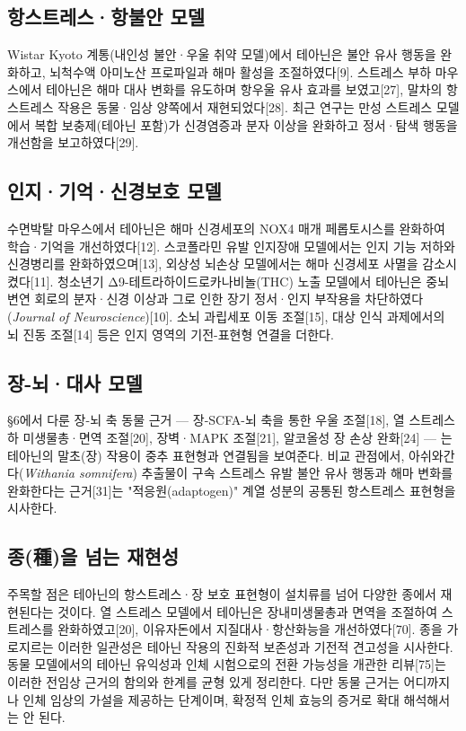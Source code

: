 \documentclass[11pt,oneside]{book}
\begin{document}
\subsection{항스트레스·항불안 모델}
Wistar Kyoto 계통(내인성 불안·우울 취약 모델)에서 테아닌은 불안 유사 행동을 완화하고, 뇌척수액 아미노산 프로파일과 해마 활성을 조절하였다[9]. 스트레스 부하 마우스에서 테아닌은 해마 대사 변화를 유도하며 항우울 유사 효과를 보였고[27], 말차의 항스트레스 작용은 동물·임상 양쪽에서 재현되었다[28]. 최근 연구는 만성 스트레스 모델에서 복합 보충제(테아닌 포함)가 신경염증과 분자 이상을 완화하고 정서·탐색 행동을 개선함을 보고하였다[29].

\subsection{인지·기억·신경보호 모델}
수면박탈 마우스에서 테아닌은 해마 신경세포의 NOX4 매개 페롭토시스를 완화하여 학습·기억을 개선하였다[12]. 스코폴라민 유발 인지장애 모델에서는 인지 기능 저하와 신경병리를 완화하였으며[13], 외상성 뇌손상 모델에서는 해마 신경세포 사멸을 감소시켰다[11]. 청소년기 Δ9-테트라하이드로카나비놀(THC) 노출 모델에서 테아닌은 중뇌변연 회로의 분자·신경 이상과 그로 인한 장기 정서·인지 부작용을 차단하였다(\textit{Journal of Neuroscience})[10]. 소뇌 과립세포 이동 조절[15], 대상 인식 과제에서의 뇌 진동 조절[14] 등은 인지 영역의 기전-표현형 연결을 더한다.

\subsection{장-뇌·대사 모델}
§6에서 다룬 장-뇌 축 동물 근거 — 장-SCFA-뇌 축을 통한 우울 조절[18], 열 스트레스 하 미생물총·면역 조절[20], 장벽·MAPK 조절[21], 알코올성 장 손상 완화[24] — 는 테아닌의 말초(장) 작용이 중추 표현형과 연결됨을 보여준다. 비교 관점에서, 아쉬와간다(\textit{Withania somnifera}) 추출물이 구속 스트레스 유발 불안 유사 행동과 해마 변화를 완화한다는 근거[31]는 "적응원(adaptogen)" 계열 성분의 공통된 항스트레스 표현형을 시사한다.

\subsection{종(種)을 넘는 재현성}
주목할 점은 테아닌의 항스트레스·장 보호 표현형이 설치류를 넘어 다양한 종에서 재현된다는 것이다. 열 스트레스 모델에서 테아닌은 장내미생물총과 면역을 조절하여 스트레스를 완화하였고[20], 이유자돈에서 지질대사·항산화능을 개선하였다[70]. 종을 가로지르는 이러한 일관성은 테아닌 작용의 진화적 보존성과 기전적 견고성을 시사한다. 동물 모델에서의 테아닌 유익성과 인체 시험으로의 전환 가능성을 개관한 리뷰[75]는 이러한 전임상 근거의 함의와 한계를 균형 있게 정리한다. 다만 동물 근거는 어디까지나 인체 임상의 가설을 제공하는 단계이며, 확정적 인체 효능의 증거로 확대 해석해서는 안 된다.
\end{document}

